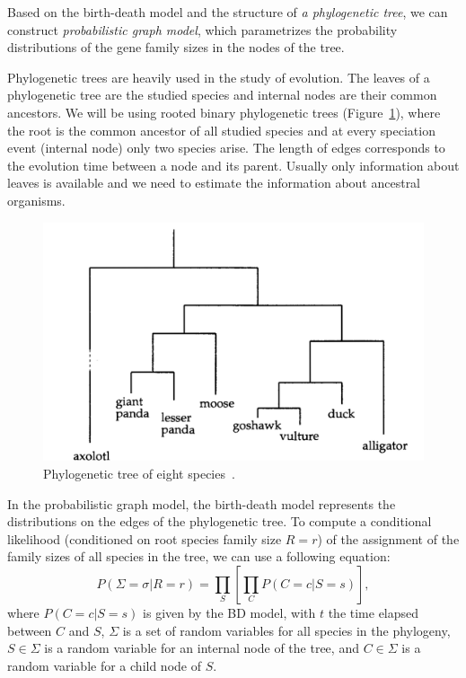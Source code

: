 
Based on the birth-death model and the structure of \emph{a phylogenetic tree}, we can construct \emph{probabilistic graph model}, which parametrizes the probability distributions of the gene family sizes in the nodes of the tree.

Phylogenetic trees are heavily used in the study of evolution. The leaves of a phylogenetic tree are the studied species and internal nodes are their common ancestors. We will be using rooted binary phylogenetic trees (Figure~\ref{fig:phylogenetic-tree}), where the root is the common ancestor of all studied species and at every speciation event (internal node) only two species arise. The length of edges corresponds to the evolution time between a node and its parent. Usually only information about leaves is available and we need to estimate the information about ancestral organisms.

\begin{figure}[htbp]
  \centering
  \includegraphics[width=.5\textwidth]{../figures/phylogenetic_tree}
  \caption[Phylogenetic tree]{Phylogenetic tree of eight species~\cite{durbin}.}\label{fig:phylogenetic-tree}
\end{figure}

In the probabilistic graph model, the birth-death model represents the distributions on the edges of the phylogenetic tree.
To compute a conditional likelihood (conditioned on root species family size $R = r$) of the assignment of the family sizes of all species in the tree, we can use a following equation:
$$P(\Sigma = \sigma | R = r) = \prod_{S} \left[\prod_{C} P(C = c|S = s)\right],$$
where $P(C = c|S = s)$ is given by the BD model, with $t$ the time elapsed between $C$ and $S$, $\Sigma$ is a set of random variables for all species in the phylogeny, $S \in \Sigma$ is a random variable for an internal node of the tree, and $C \in \Sigma$ is a random variable for a child node of $S$.

